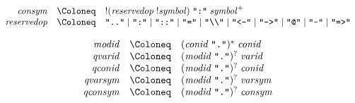 \begin{align*}
\begin{array}{rcl}
    \\
    \mathit{consym}
    & \Coloneq & {!} (\mathit{reservedop}\; !\mathit{symbol})\; \text{\texttt{\textquotedbl :\textquotedbl}}\; \mathit{symbol}^+
    \\
    \mathit{reservedop}
    & \Coloneq & \text{\texttt{\textquotedbl ..\textquotedbl}}
    \mid \text{\texttt{\textquotedbl :\textquotedbl}}
    \mid \text{\texttt{\textquotedbl ::\textquotedbl}}
    \mid \text{\texttt{\textquotedbl =\textquotedbl}}
    \mid \text{\texttt{\textquotedbl \textbackslash\textbackslash\textquotedbl}}
    \mid \text{\texttt{\textquotedbl <-\textquotedbl}}
    \mid \text{\texttt{\textquotedbl ->\textquotedbl}}
    \mid \text{\texttt{\textquotedbl @\textquotedbl}}
    \mid \text{\texttt{\textquotedbl \textasciitilde\textquotedbl}}
    \mid \text{\texttt{\textquotedbl =>\textquotedbl}}
  \end{array}
\end{align*}

\begin{align*}
  \begin{array}{rcl}
    \mathit{modid}
    & \Coloneq & (\mathit{conid}\; \text{\texttt{\textquotedbl .\textquotedbl}})^*\; \mathit{conid}
    \\
    \mathit{qvarid}
    & \Coloneq & (\mathit{modid}\; \text{\texttt{\textquotedbl .\textquotedbl}})^?\; \mathit{varid}
    \\
    \mathit{qconid}
    & \Coloneq & (\mathit{modid}\; \text{\texttt{\textquotedbl .\textquotedbl}})^?\; \mathit{conid}
    \\
    \mathit{qvarsym}
    & \Coloneq & (\mathit{modid}\; \text{\texttt{\textquotedbl .\textquotedbl}})^?\; \mathit{varsym}
    \\
    \mathit{qconsym}
    & \Coloneq & (\mathit{modid}\; \text{\texttt{\textquotedbl .\textquotedbl}})^?\; \mathit{consym}
  \end{array}
\end{align*}

